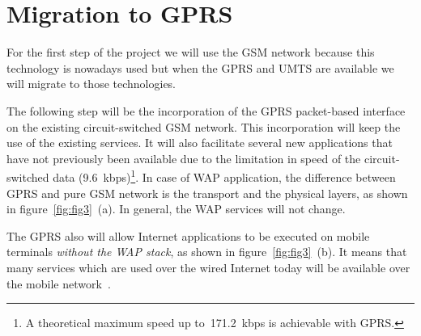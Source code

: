 \section{Migration to GPRS}
 
For the first step of the project we will use the GSM network because
this technology is nowadays used but when the GPRS and UMTS 
are available we will migrate to those technologies. 

The following step will be the incorporation of the GPRS packet-based
interface on the existing circuit-switched GSM network. This
incorporation will keep the use of the existing services. It will
also facilitate several new applications that have not previously been
available due to the limitation in speed of the circuit-switched data
(9.6~kbps)\footnote{A theoretical maximum speed up to~171.2~kbps is
achievable with GPRS.}. In case of WAP application, the difference
between GPRS and pure GSM network is the transport and the physical
layers, as shown in figure~\ref{fig:fig3}~(a). In general, the WAP
services will not change.

The GPRS also will allow Internet applications to be executed on
mobile terminals \emph{without the WAP stack}, as shown in
figure~\ref{fig:fig3}~(b). It means that many services which are used
over the wired Internet today will be available over the mobile 
network~\cite{GPRS}.


